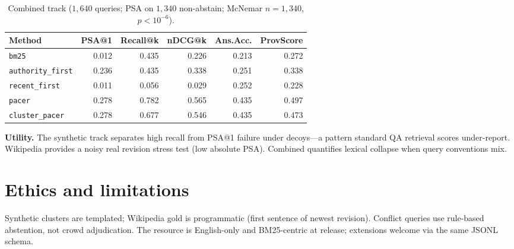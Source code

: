 \documentclass[sigconf]{acmart}
\begin{document}
\begin{table}[t]
\centering
\small
\caption{Combined track ($1{,}640$ queries; PSA on $1{,}340$ non-abstain; McNemar $n{=}1{,}340$, $p{<}10^{-6}$).}
\label{tab:eval_combined}
\begin{tabular}{lrrrrr}
\toprule
Method & PSA@1 & Recall@k & nDCG@k & Ans.Acc. & ProvScore \\
\midrule
\texttt{bm25} & 0.012 & 0.435 & 0.226 & 0.213 & 0.272 \\
\texttt{authority\_first} & 0.236 & 0.435 & 0.338 & 0.251 & 0.338 \\
\texttt{recent\_first} & 0.011 & 0.056 & 0.029 & 0.252 & 0.228 \\
\texttt{pacer} & 0.278 & 0.782 & 0.565 & 0.435 & 0.497 \\
\texttt{cluster\_pacer} & 0.278 & 0.677 & 0.546 & 0.435 & 0.473 \\
\bottomrule
\end{tabular}
\end{table}

\textbf{Utility.} The synthetic track separates high recall from PSA@1 failure under decoys---a pattern standard QA retrieval scores under-report.
Wikipedia provides a noisy real revision stress test (low absolute PSA).
Combined quantifies lexical collapse when query conventions mix.

\section{Ethics and limitations}
Synthetic clusters are templated; Wikipedia gold is programmatic (first sentence of newest revision).
Conflict queries use rule-based abstention, not crowd adjudication.
The resource is English-only and BM25-centric at release; extensions welcome via the same JSONL schema.



\end{document}
